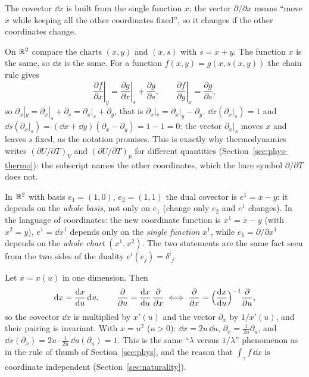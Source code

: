 The covector $\dd x$ is built from the single function $x$; the vector $\partial/\partial x$ means ``move $x$ while keeping all the other coordinates fixed'', so it changes if the other coordinates change.

\begin{example}\label{ex:sameXdiffdx}
On $\mathbb{R}^2$ compare the charts $(x,y)$ and $(x,s)$ with $s=x+y$. The function $x$ is the same, so $\dd x$ is the same. For a function $f(x,y)=g(x,s(x,y))$ the chain rule gives
\[
\left.\frac{\partial f}{\partial x}\right|_y=\left.\frac{\partial g}{\partial x}\right|_s+\frac{\partial g}{\partial s},\qquad
\left.\frac{\partial f}{\partial y}\right|_x=\frac{\partial g}{\partial s},
\]
so $\partial_x|_y=\partial_x|_s+\partial_s=\partial_x|_s+\partial_y$, that is $\partial_x|_s=\partial_x|_y-\partial_y$.
\numcheck $\dd x(\partial_x|_s)=1$ and $\dd s(\partial_x|_s)=(\dd x+\dd y)(\partial_x-\partial_y)=1-1=0$: the vector $\partial_x|_s$ moves $x$ and leaves $s$ fixed, as the notation promises.
This is exactly why thermodynamics writes $(\partial U/\partial T)_V$ and $(\partial U/\partial T)_p$ for different quantities (Section~\ref{sec:phys-thermo}): the subscript names the other coordinates, which the bare symbol $\partial/\partial T$ does not.
\end{example}

\begin{synthesis}
In $\mathbb{R}^2$ with basis $e_1=(1,0)$, $e_2=(1,1)$ the dual covector is $e^1=x-y$: it depends on the \emph{whole basis}, not only on $e_1$ (change only $e_2$ and $e^1$ changes).
In the language of coordinates: the new coordinate function is $x^1=x-y$ (with $x^2=y$), $e^1=\dd x^1$ depends only on the \emph{single function} $x^1$, while $e_1=\partial/\partial x^1$ depends on the \emph{whole chart} $(x^1,x^2)$.
The two statements are the same fact seen from the two sides of the duality $e^i(e_j)=\delta^i{}_j$.
\end{synthesis}

Let $x=x(u)$ in one dimension. Then
\[
\mathrm{d} x=\frac{\mathrm{d} x}{\mathrm{d} u}\,\mathrm{d} u,\qquad \frac\partial{\partial u}=\frac{\mathrm{d} x}{\mathrm{d} u}\,\frac\partial{\partial x}\iff\frac\partial{\partial x}=\Bigl(\frac{\mathrm{d} x}{\mathrm{d} u}\Bigr)^{-1}\frac\partial{\partial u},
\]
so the covector $\dd x$ is multiplied by $x'(u)$ and the vector $\partial_x$ by $1/x'(u)$, and their pairing is invariant.
\numcheck With $x=u^2$ ($u>0$): $\dd x=2u\,\dd u$, $\partial_x=\frac1{2u}\partial_u$, and $\dd x(\partial_x)=2u\cdot\frac1{2u}\,\dd u(\partial_u)=1$.
This is the same ``$\lambda$ versus $1/\lambda$'' phenomenon as in the rule of thumb of Section~\ref{sec:phys}, and the reason that $\int_\gamma f\,\dd x$ is coordinate independent (Section~\ref{sec:naturality}).

